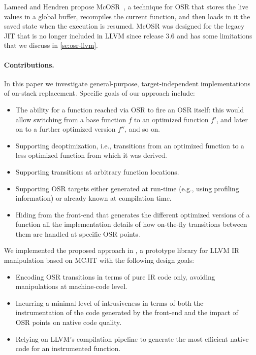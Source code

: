 Lameed and Hendren propose McOSR~\cite{lameed2013modular}, a technique for OSR that stores the live values in a global buffer, recompiles the current function, and then loads in it the saved state when the execution is resumed. McOSR was designed for the legacy JIT that is no longer included in LLVM since release 3.6 and has some limitations that we discuss in \mysection\ref{se:osr-llvm}.

\paragraph{Contributions.}
In this paper we investigate general-purpose, target-independent implementations of on-stack replacement. Specific goals of our approach include:
\begin{itemize}
\item The ability for a function reached via OSR to fire an OSR itself: this would allow switching from a base function $f$ to an optimized function $f'$, and later on to a further optimized version $f''$, and so on.
\item Supporting deoptimization, i.e., transitions from an optimized function to a less optimized function from which it was derived.
\item Supporting transitions at arbitrary function locations.
\item Supporting OSR targets either generated at run-time (e.g., using profiling information) or already known at compilation time.
\item Hiding from the front-end that generates the different optimized versions of a function all the implementation details of how on-the-fly transitions between them are handled at specific OSR points.
\end{itemize}

\noindent We implemented the proposed approach in \osrkit, a prototype library for LLVM IR manipulation based on MCJIT with the following design goals:
\begin{itemize}
\item Encoding OSR transitions in terms of pure IR code only, avoiding manipulations at machine-code level.
\item Incurring a minimal level of intrusiveness in terms of both the instrumentation of the code generated by the front-end and the impact of OSR points on native code quality.
\item Relying on LLVM's compilation pipeline to generate the most efficient native code for an instrumented function.
\end{itemize}


